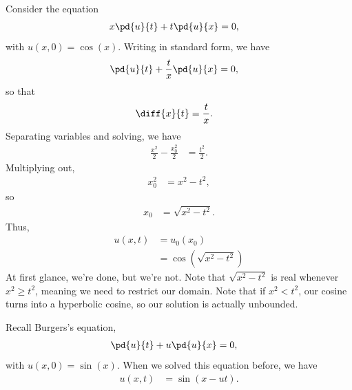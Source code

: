 \documentclass[10pt]{mypackage}
\begin{document}
\begin{example}
  Consider the equation
  \begin{align*}
    x\pd{u}{t} + t\pd{u}{x} &= 0,
  \end{align*}
  with $u\left( x,0 \right) = \cos\left( x \right)$. Writing in standard form, we have
  \begin{align*}
    \pd{u}{t} + \frac{t}{x} \pd{u}{x} &= 0,
  \end{align*}
  so that
  \begin{align*}
    \diff{x}{t} &= \frac{t}{x}.
  \end{align*}
  Separating variables and solving, we have
  \begin{align*}
    \frac{x^2}{2} - \frac{x_0^2}{2} &= \frac{t^2}{2}.
  \end{align*}
  Multiplying out,
  \begin{align*}
    x_0^2 &= x^2 - t^2,
  \end{align*}
  so
  \begin{align*}
    x_0 &= \sqrt{x^2 - t^2}.
  \end{align*}
  Thus,
  \begin{align*}
    u\left( x,t \right) &= u_0\left( x_0 \right)\\
                        &= \cos\left( \sqrt{x^2 - t^2} \right)
  \end{align*}
  At first glance, we're done, but we're not. Note that $\sqrt{x^2 - t^2}$ is real whenever $x^2 \geq t^2$, meaning we need to restrict our domain. Note that if $x^2 < t^2$, our cosine turns into a hyperbolic cosine, so our solution is actually unbounded.
\end{example}
\begin{example}
  Recall Burgers's equation,
  \begin{align*}
    \pd{u}{t} + u \pd{u}{x} &= 0,
  \end{align*}
  with $u\left( x,0 \right) = \sin\left( x \right)$. When we solved this equation before, we have
  \begin{align*}
    u\left( x,t \right) &= \sin\left( x-u t \right).
  \end{align*}
\end{example}
\end{document}
